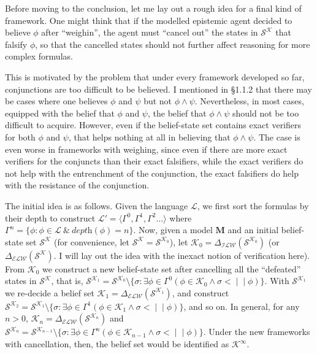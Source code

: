 \documentclass[12pt]{article}
\newcommand{\inefal}{< \! \! \mid \! \mid}
\newcommand{\K}{\mathcal{K}}
\newcommand{\SK}{\mathcal{S}^\mathcal{K}}
\begin{document}
\par
Before moving to the conclusion, let me lay out a rough idea for a final kind of framework. One might think that if the modelled epistemic agent decided to believe $\phi$ after ``weighin'', the agent must ``cancel out'' the states in $\SK$ that falsify $\phi$, so that the cancelled states should not further affect reasoning for more complex formulas.
\par
This is motivated by the problem that under every framework developed so far, conjunctions are too difficult to be believed. I mentioned in \S 1.1.2 that there may be cases where one believes $\phi$ and $\psi$ but not $\phi \land \psi$. Nevertheless, in most cases, equipped with the belief that $\phi$ and $\psi$, the belief that $\phi \land \psi$ should not be too difficult to acquire. However, even if the belief-state set contains exact verifiers for both $\phi$ and $\psi$, that helps nothing at all in believing that $\phi \land \psi$. The case is even worse in frameworks with weighing, since even if there are more exact verifiers for the conjuncts than their exact falsifiers, while the exact verifiers do not help with the entrenchment of the conjunction, the exact falsifiers do help with the resistance of the conjunction. 
\par
The initial idea is as follows. Given the language $\mathcal{L}$, we first sort the formulas by their depth to construct $\mathcal{L}' = \langle \Gamma^0, \Gamma^1, \Gamma^2 ... \rangle$ where $\Gamma^n = \{\phi: \phi \in \mathcal{L} \ \& \ \textit{depth}(\phi)=n\}$. Now, given a model $\bm{M}$ and an initial belief-state set $\SK$ (for convenience, let $\SK = \mathcal{S}^{\mathcal{K}_{0}}$), let $\K_0 = \Delta_\mathcal{ILW}(\mathcal{S}^{\mathcal{K}_{0}})$ (or $\Delta_\mathcal{ELW}(\SK)$. I will lay out the idea with the inexact notion of verification here). From $\K_0$ we construct a new belief-state set after cancelling all the ``defeated'' states in $\SK$, that is, $\mathcal{S}^{\mathcal{K}_1} = \mathcal{S}^{\mathcal{K}_{0}} \setminus \{\sigma: \exists \phi \in \Gamma^0 (\phi \in \K_0 \land \sigma \inefal \phi) \}$. With $\mathcal{S}^{\mathcal{K}_1}$ we re-decide a belief set $\K_1 = \Delta_\mathcal{ELW}(\mathcal{S}^{\mathcal{K}_1})$, and construct $\mathcal{S}^{\mathcal{K}_2} = \mathcal{S}^{\mathcal{K}_1} \setminus \{\sigma: \exists \phi \in \Gamma^1 (\phi \in \K_1 \land \sigma \inefal \phi) \}$, and so on. In general, for any $n > 0$, $\K_n = \Delta_\mathcal{ELW}(\mathcal{S}^{\mathcal{K}_{n}})$ and $\mathcal{S}^{\mathcal{K}_n} = \mathcal{S}^{\mathcal{K}_{n-1}} \setminus \{\sigma: \exists \phi \in \Gamma^n (\phi \in \K_{n-1} \land \sigma \inefal \phi) \}$. Under the new frameworks with cancellation, then, the belief set would be identified as $\K^\infty$. 
\end{document}
